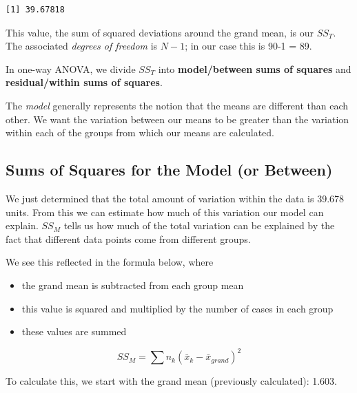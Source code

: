\documentclass[
  11pt,
]{book}
\newenvironment{Shaded}{\begin{snugshade}}{\end{snugshade}}
\newcommand{\FunctionTok}[1]{\textcolor[rgb]{0.00,0.00,0.00}{#1}}
\newcommand{\NormalTok}[1]{#1}
\newcommand{\OtherTok}[1]{\textcolor[rgb]{0.56,0.35,0.01}{#1}}
\newcommand{\SpecialCharTok}[1]{\textcolor[rgb]{0.00,0.00,0.00}{#1}}
\providecommand{\tightlist}{%
  \setlength{\itemsep}{0pt}\setlength{\parskip}{0pt}}
\begin{document}
\begin{Shaded}
\end{Shaded}

\begin{verbatim}
[1] 39.67818
\end{verbatim}

This value, the sum of squared deviations around the grand mean, is our \(SS_T\). The associated \emph{degrees of freedom} is \(N - 1\); in our case this is 90-1 = 89.

In one-way ANOVA, we divide \(SS_T\) into \textbf{model/between sums of squares} and \textbf{residual/within sums of squares}.

The \emph{model} generally represents the notion that the means are different than each other. We want the variation between our means to be greater than the variation within each of the groups from which our means are calculated.

\hypertarget{sums-of-squares-for-the-model-or-between}{%
\subsection{Sums of Squares for the Model (or Between)}\label{sums-of-squares-for-the-model-or-between}}

We just determined that the total amount of variation within the data is 39.678 units. From this we can estimate how much of this variation our model can explain. \(SS_M\) tells us how much of the total variation can be explained by the fact that different data points come from different groups.

We see this reflected in the formula below, where

\begin{itemize}
\tightlist
\item
  the grand mean is subtracted from each group mean
\item
  this value is squared and multiplied by the number of cases in each group
\item
  these values are summed
\end{itemize}

\[SS_{M}= \sum n_{k}(\bar{x}_{k}-\bar{x}_{grand})^{2}\]

To calculate this, we start with the grand mean (previously calculated): 1.603.
\end{document}
